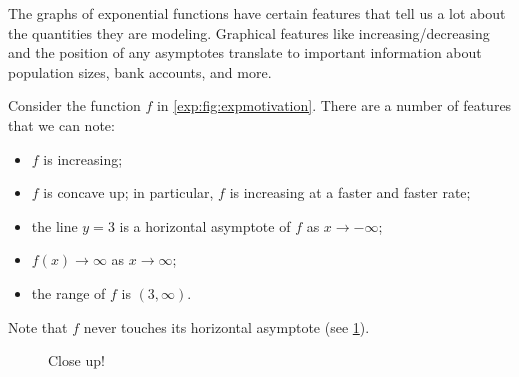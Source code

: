 The graphs of exponential functions have certain features that tell us a lot about the quantities they are modeling.  Graphical features like increasing/decreasing and the position of any asymptotes translate to important information about population sizes, bank accounts, and more.
\begin{pccexample}\label{exp:ex:asymptote}
	Consider the function $f$ in \cref{exp:fig:expmotivation}. 
	There are a number of features that we can note:
	\begin{itemize}
		\item $f$ is increasing;
		\item $f$ is concave up; in particular, $f$ is increasing at a faster and faster rate;
		\item the line $y=3$ is a horizontal asymptote of $f$ as $x\to -\infty$;
		\item $f(x)\to\infty$ as $x\to\infty$;
		\item the range of $f$ is $(3,\infty)$.
	\end{itemize}
	Note that $f$ never touches its horizontal asymptote (see \cref{exp:fig:closeup}).
\end{pccexample}
\begin{figure}[!htb]
	\begin{minipage}[t]{.5\textwidth}
		\centering
		\caption{$f(x)=2^x+3$}
		\label{exp:fig:expmotivation}
	\end{minipage}%
	\begin{minipage}[t]{.5\textwidth}
		\centering
		\caption{Close up!}
		\label{exp:fig:closeup}
	\end{minipage}%
\end{figure}
